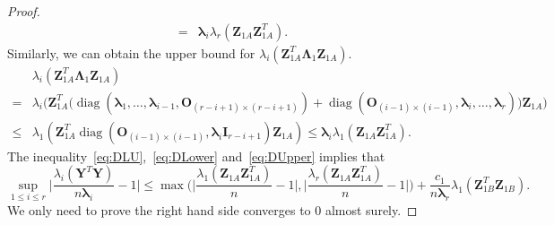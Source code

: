 \documentclass[12pt]{article} %
\DeclareMathOperator{\mydiag}{diag}
\newcommand{\bZ}{\mathbf{Z}}
\newcommand{\bY}{\mathbf{Y}}
\newcommand{\bO}{\mathbf{O}}
\newcommand{\bI}{\mathbf{I}}
\newcommand{\bfsym}[1]{\ensuremath{\boldsymbol{#1}}}
\def\blambda {\bfsym {\lambda}}
\def\bLambda {\bfsym {\Lambda}}
\theoremstyle{definition}
\begin{document}
\begin{appendices}
\begin{proof}
\begin{equation}
\begin{aligned}
= &
\blambda_i \lambda_r(\bZ_{1A}\bZ_{1A}^T).
\end{aligned}
\end{equation}
Similarly, we can obtain the upper bound for
$\lambda_i(\bZ_{1A}^T \bLambda_1 \bZ_{1A})$.
\begin{equation}\label{eq:DUpper}
\begin{aligned}
&\lambda_i(\bZ_{1A}^T \bLambda_1 \bZ_{1A})
\\
=&\lambda_i\Big(
\bZ_{1A}^T \big(
\mydiag(\blambda_1,\ldots,\blambda_{i-1},\bO_{(r-i+1)\times(r-i+1)})+
\mydiag(\bO_{(i-1)\times(i-1)},\blambda_i,\ldots,\blambda_r)
\big)
\bZ_{1A}
\Big)\\
    \leq&
\lambda_1(\bZ_{1A}^T \mydiag(\bO_{(i-1)\times(i-1)},\blambda_i \bI_{r-i+1}) \bZ_{1A})
\leq  \blambda_i \lambda_1(\bZ_{1A}\bZ_{1A}^T).
\end{aligned}
\end{equation}
    The inequality~\eqref{eq:DLU},~\eqref{eq:DLower} and~\eqref{eq:DUpper} implies that
\begin{equation}\label{mainInequality}
\sup_{1\leq i \leq r} \Big|\frac{\lambda_i(\bY^T \bY)}{n\blambda_i}-1\Big|\leq
\max\Big(\Big|\frac{\lambda_1(\bZ_{1A}\bZ_{1A}^T)}{n}-1\Big|,\Big|\frac{\lambda_r(\bZ_{1A}\bZ_{1A}^T)}{n}-1\Big|\Big)+\frac{c_1}{n\blambda_r}\lambda_1(\bZ_{1B}^T \bZ_{1B}).
\end{equation}
    We only need to prove the right hand side converges to $0$ almost surely.


\end{proof}
\end{appendices}
\end{document}
